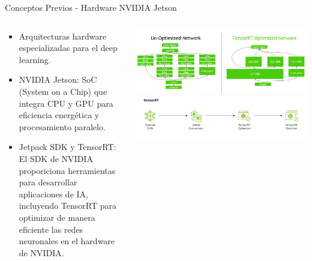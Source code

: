 \documentclass[spanish]{beamer}
\begin{document}
\begin{frame}{Conceptos Previos - Hardware NVIDIA Jetson}
    
    \begin{columns}
        \begin{column}{0.5\textwidth}
            \begin{itemize}
                \item Arquitecturas hardware especializadas para el deep learning.
                \item NVIDIA Jetson: SoC (System on a Chip) que integra CPU y GPU para eficiencia energética y procesamiento paralelo.
                \item Jetpack SDK y TensorRT: El SDK de NVIDIA proporiciona herramientas para desarrollar aplicaciones de IA, incluyendo TensorRT para optimizar de manera eficiente las redes neuronales en el hardware de NVIDIA.
            \end{itemize}
        \end{column}
        \begin{column}{0.5\textwidth}
            \includegraphics[width=1\textwidth]{images/conceptos_previos/TensorRT_optimizaciones.png}
            \includegraphics[width=1\textwidth]{images/conceptos_previos/TensorRT_pipeline.png}
        \end{column}
    \end{columns}
\end{frame}
\end{document}
